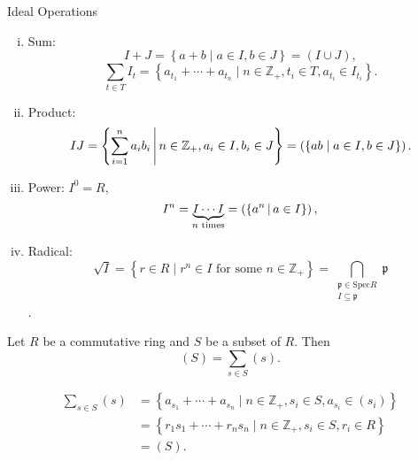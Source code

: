 \begin{definition}{Ideal Operations}{}
    \begin{enumerate}[(i)]
        \item Sum: $$I+J=\left\{a+b\mid a\in I,b\in J\right\}=\left(I\cup J\right),$$
        $$
        \sum_{t \in T} I_t=\left\{a_{t_1}+ \cdots +a_{t_n}\mid n\in\mathbb{Z}_{+},t_i\in T,a_{t_i}\in I_{t_i}\right\}.
        $$
        \item Product: $$IJ=\left\{\sum_{i=1}^n a_ib_i\,\middle\vert\, n\in\mathbb{Z}_{+},a_i\in I,b_i\in J\right\}=\left(\{ab\mid a\in I,b\in J\}\right).$$
        \item Power: $I^0=R$,
        \[
            I^n=\underbrace{I\cdots I}_{n\text{ times}}=\left(\{a^n\,\middle\vert\, a\in I\}\right), 
            \]
        \item Radical: \[
            \sqrt{I} = \left\{ r \in R \mid r^n \in I \text{ for some } n \in \mathbb{Z}_{+} \right\} = \bigcap_{\substack{\mathfrak{p} \in \mathrm{Spec} R \\ I \subseteq \mathfrak{p}}} \mathfrak{p}
            \].
    \end{enumerate}
\end{definition}

\begin{proposition}{}{}
    Let $R$ be a commutative ring and $S$ be a subset of $R$. Then 
    $$(S)=\sum_{s\in S}(s).$$
\end{proposition}

\begin{prf}
    \begin{align*}
        \sum_{s \in S} (s)&=\left\{a_{s_1}+ \cdots +a_{s_n}\mid n\in\mathbb{Z}_{+},s_i\in S,a_{s_i}\in (s_i)\right\}\\
        &=\left\{r_1s_{1}+ \cdots +r_ns_{n}\mid n\in\mathbb{Z}_{+},s_i\in S,r_i\in R\right\}\\
        &=(S).
    \end{align*}
\end{prf}


